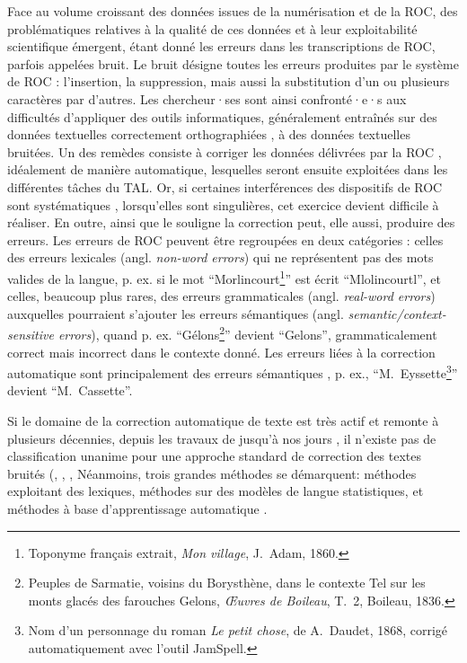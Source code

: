 Face au volume croissant des données issues de la numérisation et de la ROC, des problématiques relatives à la qualité de ces données et à leur exploitabilité scientifique émergent, étant donné 
les erreurs dans les transcriptions de ROC, parfois appelées bruit. Le bruit désigne toutes les erreurs produites par le système de ROC : l’insertion, la suppression, mais aussi la substitution d’un ou plusieurs caractères par d’autres. Les chercheur·ses sont ainsi confronté·e·s aux difficultés d’appliquer des outils informatiques, généralement entraînés sur des données textuelles correctement orthographiées \cite{DBLP:journals/corr/EshelCRMYL17}, à des données textuelles bruitées. Un des remèdes consiste à corriger les données délivrées par la ROC \cite{DBLP:conf/taln/SagotG14}, idéalement de manière automatique, lesquelles seront ensuite exploitées dans les différentes tâches du TAL. Or, si certaines interférences des dispositifs de ROC sont systématiques \cite{stanislawek-2019}, lorsqu’elles sont singulières, cet exercice devient difficile à réaliser. En outre, ainsi que le souligne \cite{huynh} la correction peut, elle aussi, produire des erreurs. 
Les erreurs de ROC peuvent être regroupées en deux catégories \cite{oger} : celles des erreurs lexicales (angl. \textit{non-word errors}) qui ne représentent pas des mots valides de la langue, p. ex. si le mot “Morlincourt\footnote{Toponyme français extrait, \textit{Mon village}, J.\ Adam, 1860.}” est écrit “Mlolincourtl”, et celles, beaucoup plus rares, des erreurs grammaticales (angl. \textit{real-word errors}) \cite{wisniewski} auxquelles pourraient s'ajouter les erreurs sémantiques (angl. \textit{semantic/context-sensitive errors}), quand p. ex. “Gélons\footnote{Peuples de Sarmatie, voisins du Borysthène, dans le contexte  \og{}Tel sur les monts glacés des farouches Gelons\fg{}, \textit{Œuvres de Boileau}, T.\ 2, Boileau, 1836.}” devient “Gelons”, grammaticalement correct mais incorrect dans le contexte donné. Les erreurs liées à la correction automatique sont principalement des erreurs sémantiques \cite{azmi}, p. ex., “M.\ Eyssette\footnote{Nom d’un personnage du roman \textit{Le petit chose}, de A.\ Daudet, 1868, corrigé automatiquement avec l'outil JamSpell.}” devient “M.\ Cassette”. 

Si le domaine de la correction automatique de texte est très actif et remonte à plusieurs décennies, depuis les travaux de \cite{damerau} jusqu’à nos jours \cite{nguyen2021}, il n’existe pas de classification unanime pour une approche standard de correction des textes bruités (\cite{DBLP:journals/corr/abs-1203-5255}, \cite{dumasmilneedwards:tel-01562039}, \cite{Nguyen-2020}, %
Néanmoins, trois grandes méthodes se démarquent: méthodes exploitant des lexiques, méthodes sur des modèles de langue statistiques, et méthodes à base d’apprentissage automatique \cite{petkovic2022impact}. 

